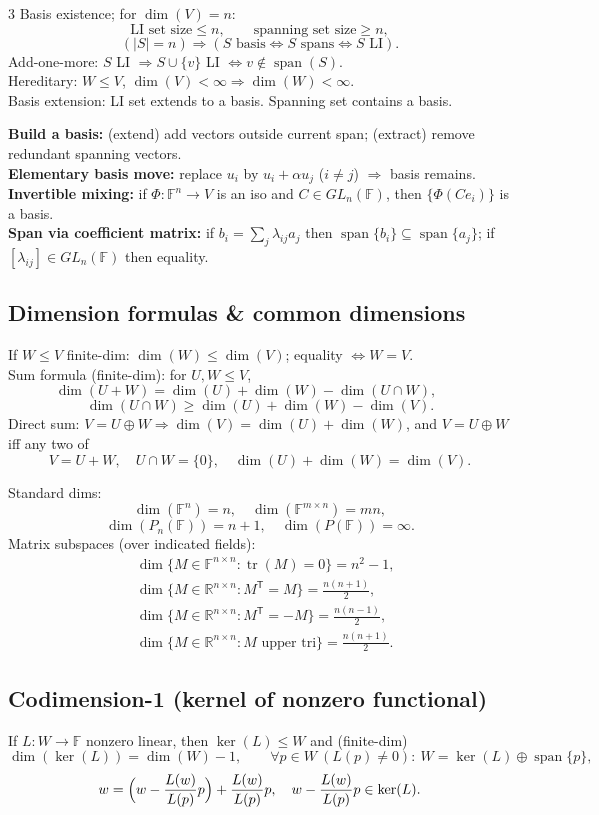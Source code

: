 \documentclass[10pt]{article}
\newcommand{\R}{\mathbb{R}}
\newcommand{\F}{\mathbb{F}}
\newcommand{\Ker}{\operatorname{ker}}
\newcommand{\spann}{\operatorname{span}}
\newcommand{\tr}{\operatorname{tr}}
\begin{document}
\begin{multicols}{3}
Basis existence; for $\dim(V)=n$:
\[
\text{LI set size}\le n,\qquad \text{spanning set size}\ge n,
\]
\[
(|S|=n)\Rightarrow (S\text{ basis}\iff S\text{ spans}\iff S\text{ LI}).
\]
Add-one-more: $S$ LI $\Rightarrow S\cup\{v\}$ LI $\iff v\notin\spann(S)$.\\
Hereditary: $W\le V$, $\dim(V)<\infty\Rightarrow \dim(W)<\infty$.\\
Basis extension: LI set extends to a basis. Spanning set contains a basis.

\textbf{Build a basis:} (extend) add vectors outside current span; (extract) remove redundant spanning vectors.\\
\textbf{Elementary basis move:} replace $u_i$ by $u_i+\alpha u_j$ ($i\neq j$) $\Rightarrow$ basis remains.\\
\textbf{Invertible mixing:} if $\Phi:\F^n\to V$ is an iso and $C\in GL_n(\F)$, then $\{\Phi(Ce_i)\}$ is a basis.\\
\textbf{Span via coefficient matrix:} if $b_i=\sum_j\lambda_{ij}a_j$ then $\spann\{b_i\}\subseteq\spann\{a_j\}$; if $[\lambda_{ij}]\in GL_n(\F)$ then equality.

\subsection*{Dimension formulas \& common dimensions}
If $W\le V$ finite-dim: $\dim(W)\le \dim(V)$; equality $\iff W=V$.\\
Sum formula (finite-dim): for $U,W\le V$,
\[
\dim(U+W)=\dim(U)+\dim(W)-\dim(U\cap W),\qquad
\]
\[
\dim(U\cap W)\ge \dim(U)+\dim(W)-\dim(V).
\]
Direct sum: $V=U\oplus W \Rightarrow \dim(V)=\dim(U)+\dim(W)$, and $V=U\oplus W$ iff any two of
\[
V=U+W,\quad U\cap W=\{0\},\quad \dim(U)+\dim(W)=\dim(V).
\]

Standard dims:
\[
\dim(\F^n)=n,\quad \dim(\F^{m\times n})=mn,
\]
\[
\dim(P_n(\F))=n+1,\quad \dim(P(\F))=\infty.
\]
Matrix subspaces (over indicated fields):
\begin{align*}
    &\dim\{M\in\F^{n\times n}:\tr(M)=0\}=n^2-1,\\ 
    &\dim\{M\in\R^{n\times n}:M^{\mathsf T}=M\}=\tfrac{n(n+1)}{2}, \\
    &\dim\{M\in\R^{n\times n}:M^{\mathsf T}=-M\}=\tfrac{n(n-1)}{2},\\
    &\dim\{M\in\R^{n\times n}:M\text{ upper tri}\}=\tfrac{n(n+1)}{2}.
\end{align*}


\subsection*{Codimension-1 (kernel of nonzero functional)}
If $L:W\to\F$ nonzero linear, then $\Ker(L)\le W$ and (finite-dim)
\[
\dim(\Ker(L))=\dim(W)-1,\qquad
\forall p\in W\ (L(p)\neq 0):\ W=\Ker(L)\oplus\spann\{p\},
\]
\[
w=\Bigl(w-\frac{L(w)}{L(p)}p\Bigr)+\frac{L(w)}{L(p)}p,\quad
w-\frac{L(w)}{L(p)}p\in\Ker(L).
\]


\end{multicols}
\end{document}
